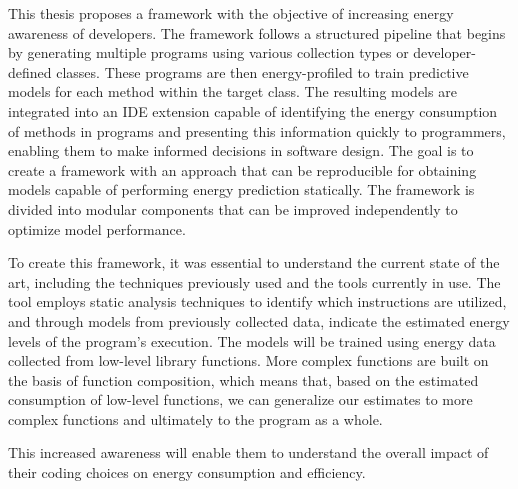 This thesis proposes a framework with the objective of increasing energy awareness of developers. The framework follows a structured pipeline that begins by generating multiple programs using various collection types or developer-defined classes. These programs are then energy-profiled to train predictive models for each method within the target class.
The resulting models are integrated into an IDE extension capable of identifying the energy consumption of methods in programs and presenting this information quickly to programmers, enabling them to make informed decisions in software design. The goal is to create a framework with an approach that can be reproducible for obtaining models capable of performing energy prediction statically. The framework is divided into modular components that can be improved independently to optimize model performance.

To create this framework, it was essential to understand the current state of the art, including the techniques previously used and the tools currently in use. The tool employs static analysis techniques to identify which instructions are utilized, and through models from previously collected data, indicate the estimated energy levels of the program's execution. The models will be trained using energy data collected from low-level library functions. More complex functions are built on the basis of function composition, which means that, based on the estimated consumption of low-level functions, we can generalize our estimates to more complex functions and ultimately to the program as a whole. 

This increased awareness will enable them to understand the overall impact of their coding choices on energy consumption and efficiency.



